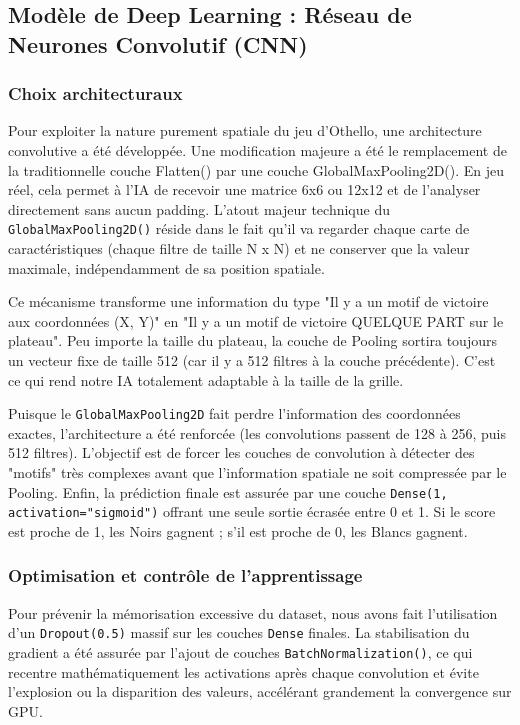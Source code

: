 \documentclass[a4paper]{article}
\begin{document}
\subsection{Modèle de Deep Learning : Réseau de Neurones Convolutif (CNN)}
\subsubsection{Choix architecturaux}
Pour exploiter la nature purement spatiale du jeu d'Othello, une architecture convolutive a été développée. Une modification majeure a été le remplacement de la traditionnelle couche Flatten() par une couche GlobalMaxPooling2D(). En jeu réel, cela permet à l'IA de recevoir une matrice 6x6 ou 12x12 et de l'analyser directement sans aucun padding. L'atout majeur technique du \verb|GlobalMaxPooling2D()| réside dans le fait qu'il va regarder chaque carte de caractéristiques (chaque filtre de taille N x N) et ne conserver que la valeur maximale, indépendamment de sa position spatiale.

Ce mécanisme transforme une information du type "Il y a un motif de victoire aux coordonnées (X, Y)" en "Il y a un motif de victoire QUELQUE PART sur le plateau". Peu importe la taille du plateau, la couche de Pooling sortira toujours un vecteur fixe de taille 512 (car il y a 512 filtres à la couche précédente). C'est ce qui rend notre IA totalement adaptable à la taille de la grille.

Puisque le \verb|GlobalMaxPooling2D| fait perdre l'information des coordonnées exactes, l'architecture a été renforcée (les convolutions passent de 128 à 256, puis 512 filtres). L'objectif est de forcer les couches de convolution à détecter des "motifs" très complexes avant que l'information spatiale ne soit compressée par le Pooling. Enfin, la prédiction finale est assurée par une couche \verb|Dense(1, activation="sigmoid")| offrant une seule sortie écrasée entre 0 et 1. Si le score est proche de 1, les Noirs gagnent ; s'il est proche de 0, les Blancs gagnent.

\subsubsection{Optimisation et contrôle de l'apprentissage}
Pour prévenir la mémorisation excessive du dataset, nous avons fait l'utilisation d'un \verb|Dropout(0.5)| massif sur les couches \verb|Dense| finales. La stabilisation du gradient a été assurée par l'ajout de couches \verb|BatchNormalization()|, ce qui recentre mathématiquement les activations après chaque convolution et évite l'explosion ou la disparition des valeurs, accélérant grandement la convergence sur GPU.
\end{document}
